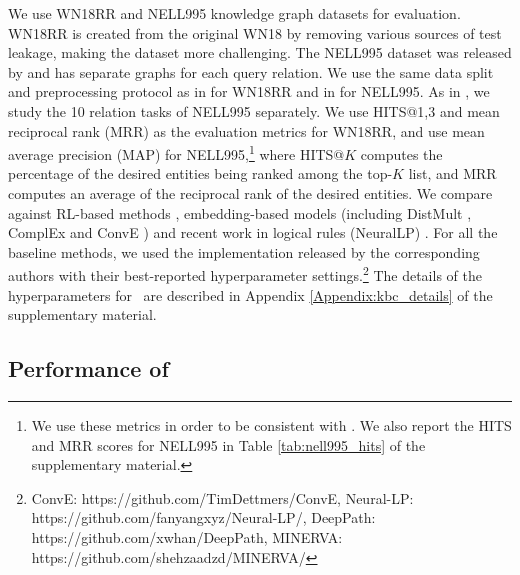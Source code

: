 \documentclass{article}
\begin{document}
	We use WN18RR and NELL995 knowledge graph datasets for evaluation. WN18RR \cite{dettmers2018conve} is created from the original WN18 \cite{bordes2013translating} by removing various sources of test leakage, making the dataset more challenging. The NELL995 dataset was released by \cite{DeepPath} and has separate graphs for each query relation.
	We use the same data split and preprocessing protocol as in \cite{dettmers2018conve} for WN18RR and in \cite{DeepPath, GoforaWalk} for NELL995. 
	As in \cite{DeepPath, GoforaWalk}, we study the 10 relation tasks of NELL995 separately.
	We use HITS@1,3 and mean reciprocal rank (MRR) as the evaluation metrics for WN18RR, and use mean average precision (MAP) for NELL995,\footnote{We use these metrics in order to be consistent with \cite{DeepPath,GoforaWalk}. We also report the HITS and MRR scores for NELL995 in Table \ref{tab:nell995_hits} of the supplementary material.} where HITS@$K$ computes the percentage of the desired entities being ranked among the top-$K$ list, and MRR computes an average of the reciprocal rank of the desired entities. 
	We compare against RL-based methods \cite{DeepPath, GoforaWalk}, embedding-based models (including DistMult \cite{DBLP:journals/corr/YangYHGD14a}, ComplEx \cite{trouillon2016complex} and ConvE \cite{dettmers2018conve}) and recent work in logical rules (NeuralLP) \cite{yang2017differentiable}. 
	For all the baseline methods, we used the implementation released by the corresponding authors with their best-reported hyperparameter settings.\footnote{ConvE: https://github.com/TimDettmers/ConvE, Neural-LP: https://github.com/fanyangxyz/Neural-LP/, DeepPath: https://github.com/xwhan/DeepPath, MINERVA: https://github.com/shehzaadzd/MINERVA/} The details of the hyperparameters for \modelname~are described in Appendix \ref{Appendix:kbc_details} of the supplementary material.
	
	
	\subsection{Performance of \modelname}
\end{document}
